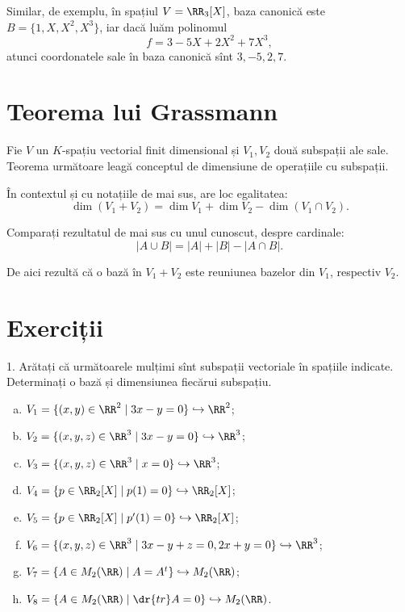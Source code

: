 Similar, de exemplu, în spațiul $ V = \RR_3[X] $, baza canonică este
$ B = \{ 1, X, X^2, X^3 \} $, iar dacă luăm polinomul
\[
  f = 3 - 5X + 2X^2 + 7X^3,
\]
atunci coordonatele sale în baza canonică sînt $ 3, -5, 2, 7 $.

\section{Teorema lui Grassmann}

Fie $ V $ un $ K $-spațiu vectorial finit dimensional și $ V_1, V_2 $ două subspații
ale sale. Teorema următoare leagă conceptul de dimensiune de operațiile cu subspații.

\begin{theorem}\label{thm:grass}
  În contextul și cu notațiile de mai sus, are loc egalitatea:
  \[
    \dim(V_1 + V_2) = \dim V_1 + \dim V_2 - \dim(V_1 \cap V_2).
  \]
\end{theorem}

Comparați rezultatul de mai sus cu unul cunoscut, despre cardinale:
\[
  |A \cup B| = |A| + |B| - |A \cap B|.
\]

De aici rezultă că o bază în $ V_1 + V_2 $ este reuniunea bazelor din $ V_1 $,
respectiv $ V_2 $.

\section{Exerciții}

1. Arătați că următoarele mulțimi sînt subspații vectoriale în spațiile indicate.
Determinați o bază și dimensiunea fiecărui subspațiu.
\begin{enumerate}[(a)]
\item $ V_1 = \{ (x, y) \in \RR^2 \mid 3x - y = 0 \} \hookrightarrow \RR^2 $;
\item $ V_2 = \{ (x, y, z) \in \RR^3 \mid 3x - y = 0 \} \hookrightarrow \RR^3 $;
\item $ V_3 = \{ (x, y, z) \in \RR^3 \mid x = 0 \} \hookrightarrow \RR^3 $;
\item $ V_4 = \{ p \in \RR_2[X] \mid p(1) = 0 \} \hookrightarrow \RR_2[X] $;
\item $ V_5 = \{ p \in \RR_2[X] \mid p'(1) = 0 \} \hookrightarrow \RR_2[X] $;
\item $ V_6 = \{ (x, y, z) \in \RR^3 \mid 3x - y + z = 0, 2x + y = 0 \} \hookrightarrow \RR^3 $;
\item $ V_7 = \{ A \in M_2(\RR) \mid A = A^t \} \hookrightarrow M_2(\RR) $;
\item $ V_8 = \{ A \in M_2(\RR) \mid \dr{tr}A = 0 \} \hookrightarrow M_2(\RR) $.
\end{enumerate}

